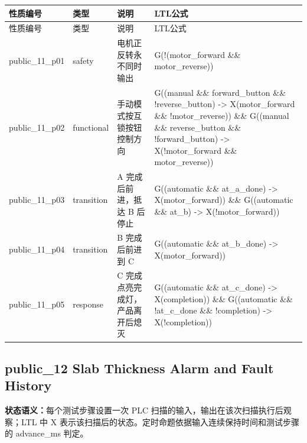 \begin{longtable}{L{2.3cm}L{1.7cm}L{4.1cm}L{5.2cm}}

\toprule

性质编号 & 类型 & 说明 & LTL公式\\

\midrule

\endfirsthead

\toprule

性质编号 & 类型 & 说明 & LTL公式\\

\midrule

\endhead

{\ttfamily public\_11\_p01} & safety & 电机正反转永不同时输出 & {\ttfamily G(!(motor\_forward \&\& motor\_reverse))}\\

{\ttfamily public\_11\_p02} & functional & 手动模式按互锁按钮控制方向 & {\ttfamily G((manual \&\& forward\_button \&\& !reverse\_button) -> X(motor\_forward \&\& !motor\_reverse)) \&\& G((manual \&\& reverse\_button \&\& !forward\_button) -> X(!motor\_forward \&\& motor\_reverse))}\\

{\ttfamily public\_11\_p03} & transition & A 完成后前进，抵达 B 后停止 & {\ttfamily G((automatic \&\& at\_a\_done) -> X(motor\_forward)) \&\& G((automatic \&\& at\_b) -> X(!motor\_forward))}\\

{\ttfamily public\_11\_p04} & transition & B 完成后前进到 C & {\ttfamily G((automatic \&\& at\_b\_done) -> X(motor\_forward))}\\

{\ttfamily public\_11\_p05} & response & C 完成点亮完成灯，产品离开后熄灭 & {\ttfamily G((automatic \&\& at\_c\_done) -> X(completion)) \&\& G((automatic \&\& !at\_c\_done \&\& !completion) -> X(!completion))}\\

\bottomrule

\end{longtable}

\subsection{{\ttfamily public\_12} Slab Thickness Alarm and Fault History}

\noindent\textbf{状态语义：}每个测试步骤设置一次 PLC 扫描的输入，输出在该次扫描执行后观察；LTL 中 X 表示该扫描后的状态。定时命题依据输入连续保持时间和测试步骤的 advance\_ms 判定。

